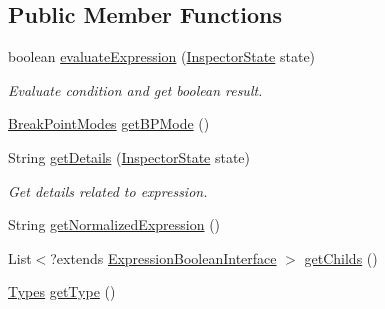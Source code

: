 \subsection*{Public Member Functions}
\begin{DoxyCompactItemize}
\item 
boolean \hyperlink{classgov_1_1nasa_1_1jpf_1_1inspector_1_1server_1_1expression_1_1expressions_1_1_expression_breakpoint_state_advanced_a409dd8b5a5ed98b64a6fea47cf1ed0d5}{evaluate\+Expression} (\hyperlink{interfacegov_1_1nasa_1_1jpf_1_1inspector_1_1server_1_1expression_1_1_inspector_state}{Inspector\+State} state)
\begin{DoxyCompactList}\small\item\em Evaluate condition and get boolean result. \end{DoxyCompactList}\item 
\hyperlink{enumgov_1_1nasa_1_1jpf_1_1inspector_1_1server_1_1breakpoints_1_1_break_point_modes}{Break\+Point\+Modes} \hyperlink{classgov_1_1nasa_1_1jpf_1_1inspector_1_1server_1_1expression_1_1expressions_1_1_expression_breakpoint_state_advanced_a176b62b899926dca6755b2b0c37b75e9}{get\+B\+P\+Mode} ()
\item 
String \hyperlink{classgov_1_1nasa_1_1jpf_1_1inspector_1_1server_1_1expression_1_1expressions_1_1_expression_breakpoint_state_advanced_a5b513dee2798b2958872f8408a15c10d}{get\+Details} (\hyperlink{interfacegov_1_1nasa_1_1jpf_1_1inspector_1_1server_1_1expression_1_1_inspector_state}{Inspector\+State} state)
\begin{DoxyCompactList}\small\item\em Get details related to expression. \end{DoxyCompactList}\item 
String \hyperlink{classgov_1_1nasa_1_1jpf_1_1inspector_1_1server_1_1expression_1_1expressions_1_1_expression_breakpoint_state_advanced_a5c66e9b86948c0b0ff6d591c448e230e}{get\+Normalized\+Expression} ()
\item 
List$<$?extends \hyperlink{interfacegov_1_1nasa_1_1jpf_1_1inspector_1_1server_1_1expression_1_1_expression_boolean_interface}{Expression\+Boolean\+Interface} $>$ \hyperlink{classgov_1_1nasa_1_1jpf_1_1inspector_1_1server_1_1expression_1_1_expression_boolean_leaf_aa99bf3cf13bd8cc1d6c33208bc83b185}{get\+Childs} ()
\item 
\hyperlink{enumgov_1_1nasa_1_1jpf_1_1inspector_1_1server_1_1expression_1_1_types}{Types} \hyperlink{classgov_1_1nasa_1_1jpf_1_1inspector_1_1server_1_1expression_1_1_expression_boolean_aed010ff8683eb1e8621e226703133457}{get\+Type} ()
\end{DoxyCompactItemize}


